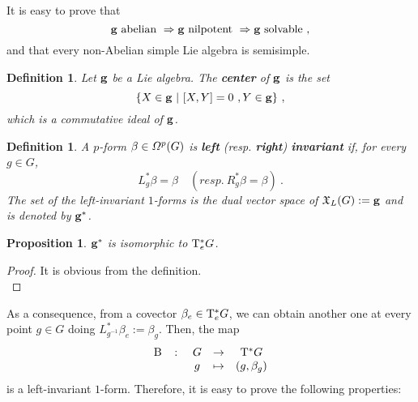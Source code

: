 \documentclass[12pt]{report}
\newtheorem{prop}[teor]{Proposition}
\newtheorem{definition}[teor]{Definition}
\def\qed{\ifvmode\removelastskip\fi
{\unskip\nobreak\hfil\penalty50\hbox{}\nobreak\hfil
\hbox{\vrule height1.2ex width1.2ex}\parfillskip=0pt
\finalhyphendemerits=0 \par\smallskip}}
\def\vf{\mathfrak X}
\def\Tan{{\rm T}}
\begin{document}
\begin{appendix}
It is easy to prove that
$$
{\bf g} \ {\rm abelian} \ \Rightarrow
{\bf g} \ {\rm nilpotent} \ \Rightarrow
{\bf g} \ {\rm solvable} \ ,
$$
and that every non-Abelian simple Lie algebra
is semisimple.

\begin{definition}
Let ${\bf g}$ be a Lie algebra.
The \textbf{center} of ${\bf g}$ is the set
$$
\{ X \in {\bf g} \ | \ [X,Y]=0 \ ,  Y \in {\bf g} \} \ ,
$$
which is a commutative ideal of ${\bf g}$.
\end{definition}

\begin{definition}
A $p$-form $\beta \in {\mit\Omega}^p(G)$ is 
\textbf{left} (resp. \textbf{right}) \textbf{invariant}
if, for every $g \in G$,
$$
L_g^*\beta = \beta \quad (resp. \ R_g^*\beta = \beta ) \ .
$$
The set of the left-invariant $1$-forms  
is the dual vector space of $\vf_L(G) := {\bf g}$ 
and is denoted by ${\bf g}^*$.
\end{definition}

\begin{prop}
${\bf g}^*$ is isomorphic to $\Tan_e^*G$.
\end{prop}
\begin{proof}
It is obvious from the definition.
\\ \qed  \end{proof}

As a consequence, from a covector  $\beta_e \in \Tan_e^*G$, 
we can obtain another one at every point $g \in G$
doing $L_{g^{-1}}^*\beta_e := \beta_g$.
Then, the map
$$ 
\begin{array}{ccccc}
{\rm B}&\colon&G&\to&\Tan^*G
\\
& &g&\mapsto&(g,\beta_g )
\end{array} 
$$
is a left-invariant $1$-form.
Therefore, it is easy to prove the following properties:


\end{appendix}
\end{document}
